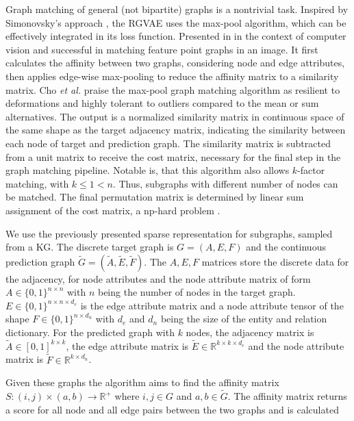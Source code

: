 {{Graph matching of general (not bipartite) graphs is a nontrivial task. Inspired by Simonovsky's approach \cite{simonovsky_graphvae_2018}, the RGVAE uses the max-pool algorithm, which can be effectively integrated in its loss function. Presented in \cite{cho_finding_2014} in the context of computer vision and successful in matching feature point graphs in an image. It first calculates the affinity between two graphs, considering node and edge attributes, then applies edge-wise max-pooling to reduce the affinity matrix to a similarity matrix. Cho \textit{et al.} praise the max-pool graph matching algorithm as resilient to deformations and highly tolerant to outliers compared to the mean or sum alternatives. The output is a normalized similarity matrix in continuous space of the same shape as the target adjacency matrix, indicating the similarity between each node of target and prediction graph. The similarity matrix is subtracted from a unit matrix to receive the cost matrix, necessary for the final step in the graph matching pipeline. Notable is, that this algorithm also allows $k$-factor matching, with $k \leq 1 < n$. Thus, subgraphs with different number of nodes can be matched. The final permutation matrix is determined by linear sum assignment of the cost matrix, a np-hard problem \cite{diestel2016graph}.

We use the previously presented sparse representation for subgraphs, sampled from a KG. The discrete target graph is $G=(A, E, F)$ and the continuous prediction graph $\widetilde{G}=(\widetilde{A}, \widetilde{E}, \widetilde{F})$. The $A, E, F$ matrices store the discrete data for the adjacency, for node attributes and the node attribute matrix of form $A \in\{0,1\}^{n \times n}$ with $n$ being the number of nodes in the target graph. $E\in\{0,1\}^{n \times n \times d_e}$ is the edge attribute matrix and a node attribute tensor of the shape $F\in\{0,1\}^{n \times d_n}$ with $d_e$ and $d_n$ being the size of the entity and relation dictionary. For the predicted graph with $k$ nodes, the adjacency matrix is $\widetilde{A} \in[0,1]^{k \times k}$, the edge attribute matrix is $\widetilde{E} \in \mathbb{R}^{k \times k \times d_{e}}$ and the node attribute matrix is $\widetilde{F} \in \mathbb{R}^{k \times d_{n}}$.


Given these graphs the algorithm aims to find the affinity matrix $S:(i, j) \times(a, b) \rightarrow \mathbb{R}^{+}$ where $i, j \in G$ and $a, b \in \widetilde{G}$. The affinity matrix returns a score for all node and all edge pairs between the two graphs and is calculated 

}}
